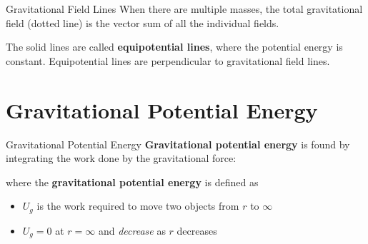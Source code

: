 \documentclass[12pt,compress,aspectratio=169]{beamer}
\begin{document}
\begin{frame}{Gravitational Field Lines}
  When there are multiple masses, the total gravitational field (dotted line)
  is the vector sum of all the individual fields.
  \begin{center}
  \end{center}
  The solid lines are called \textbf{equipotential lines}, where the potential
  energy is constant. Equipotential lines are perpendicular to
  gravitational field lines.
\end{frame}



\section{Gravitational Potential Energy}

\begin{frame}{Gravitational Potential Energy}
  \textbf{Gravitational potential energy} is found by integrating the work
  done by the gravitational force:


  where the \textbf{gravitational potential energy} is defined as
  
  \begin{itemize}
  \item $U_g$ is the work required to move two objects from $r$ to $\infty$
  \item $U_g=0$ at $r=\infty$ and \emph{decrease} as $r$ decreases
  \end{itemize}
\end{frame}
\end{document}

